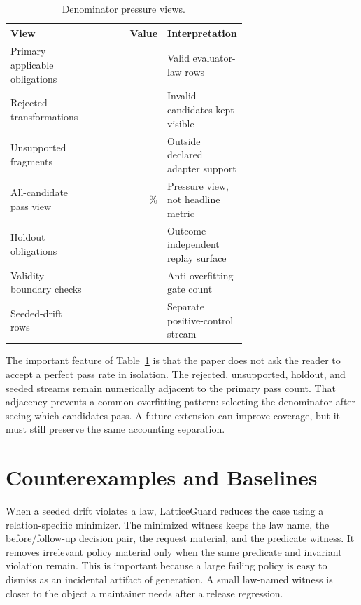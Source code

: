 \documentclass[10pt,conference]{IEEEtran}
\begin{document}
\begin{table}[t]
\centering
\caption{Denominator pressure views.}
\label{tab:denominatorpressure}
\begin{tabular}{p{0.35\linewidth}r p{0.32\linewidth}}
\toprule
View & Value & Interpretation \\
\midrule
Primary applicable obligations & \LGPrimaryObligations{} & Valid evaluator-law rows \\
Rejected transformations & \LGRejected{} & Invalid candidates kept visible \\
Unsupported fragments & \LGUnsupported{} & Outside declared adapter support \\
All-candidate pass view & \LGAllCandidatePassRate{}\% & Pressure view, not headline metric \\
Holdout obligations & \LGHoldoutObligations{} & Outcome-independent replay surface \\
Validity-boundary checks & \LGValidityBoundaryChecks{} & Anti-overfitting gate count \\
Seeded-drift rows & \LGSeededRows{} & Separate positive-control stream \\
\bottomrule
\end{tabular}
\end{table}

The important feature of Table~\ref{tab:denominatorpressure} is that the paper does not ask the reader to accept a perfect pass rate in isolation.  The rejected, unsupported, holdout, and seeded streams remain numerically adjacent to the primary pass count.  That adjacency prevents a common overfitting pattern: selecting the denominator after seeing which candidates pass.  A future extension can improve coverage, but it must still preserve the same accounting separation.

\section{Counterexamples and Baselines}
When a seeded drift violates a law, LatticeGuard reduces the case using a relation-specific minimizer.  The minimized witness keeps the law name, the before/follow-up decision pair, the request material, and the predicate witness.  It removes irrelevant policy material only when the same predicate and invariant violation remain.  This is important because a large failing policy is easy to dismiss as an incidental artifact of generation.  A small law-named witness is closer to the object a maintainer needs after a release regression.
\end{document}
